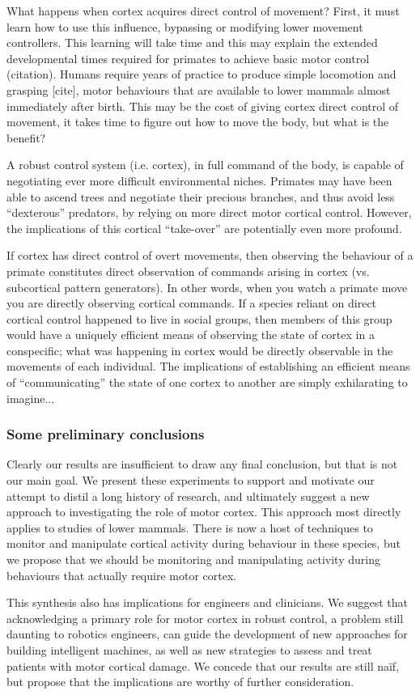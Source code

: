 What happens when cortex acquires direct control of movement? First, it must learn how to use this influence, bypassing or modifying lower movement controllers. This learning will take time and this may explain the extended developmental times required for primates to achieve basic motor control (citation). Humans require years of practice to produce simple locomotion and grasping [cite], motor behaviours that are available to lower mammals almost immediately after birth. This may be the cost of giving cortex direct control of movement, it takes time to figure out how to move the body, but what is the benefit? 

A robust control system (i.e. cortex), in full command of the body, is capable of negotiating ever more difficult environmental niches. Primates may have been able to ascend trees and negotiate their precious branches, and thus avoid less ``dexterous'' predators, by relying on more direct motor cortical control. However, the implications of this cortical ``take-over'' are potentially even more profound. 

If cortex has direct control of overt movements, then observing the behaviour of a primate constitutes direct observation of commands arising in cortex (vs. subcortical pattern generators). In other words, when you watch a primate move you are directly observing cortical commands. If a species reliant on direct cortical control happened to live in social groups, then members of this group would have a uniquely efficient means of observing the state of cortex in a conspecific; what was happening in cortex would be directly observable in the movements of each individual. The implications of establishing an efficient means of ``communicating'' the state of one cortex to another are simply exhilarating to imagine...

\subsubsection*{Some preliminary conclusions}

Clearly our results are insufficient to draw any final conclusion, but that is not our main goal. We present these experiments to support and motivate our attempt to distil a long history of research, and ultimately suggest a new approach to investigating the role of motor cortex. This approach most directly applies to studies of lower mammals. There is now a host of techniques to monitor and manipulate cortical activity during behaviour in these species, but we propose that we should be monitoring and manipulating activity during behaviours that actually require motor cortex.

This synthesis also has implications for engineers and clinicians. We suggest that acknowledging a primary role for motor cortex in robust control, a problem still daunting to robotics engineers, can guide the development of new approaches for building intelligent machines, as well as new strategies to assess and treat patients with motor cortical damage. We concede that our results are still naïf, but propose that the implications are worthy of further consideration.

